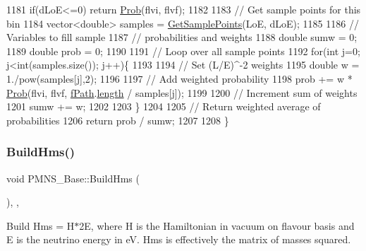 \begin{DoxyCode}
1181   \textcolor{keywordflow}{if}(dLoE<=0) \textcolor{keywordflow}{return} \hyperlink{classOscProb_1_1PMNS__Base_aec5c399b93261f1962a4b7dbbb44b973}{Prob}(flvi, flvf);
1182 
1183   \textcolor{comment}{// Get sample points for this bin}
1184   vector<double> samples = \hyperlink{classOscProb_1_1PMNS__Base_a9eac8d768c1424755ee41f7e783af179}{GetSamplePoints}(LoE, dLoE);
1185 
1186   \textcolor{comment}{// Variables to fill sample}
1187   \textcolor{comment}{// probabilities and weights}
1188   \textcolor{keywordtype}{double} sumw = 0;
1189   \textcolor{keywordtype}{double} prob = 0;
1190 
1191   \textcolor{comment}{// Loop over all sample points}
1192   \textcolor{keywordflow}{for}(\textcolor{keywordtype}{int} j=0; j<int(samples.size()); j++)\{
1193 
1194     \textcolor{comment}{// Set (L/E)^-2 weights}
1195     \textcolor{keywordtype}{double} w = 1./pow(samples[j],2);
1196 
1197     \textcolor{comment}{// Add weighted probability}
1198     prob += w * \hyperlink{classOscProb_1_1PMNS__Base_aec5c399b93261f1962a4b7dbbb44b973}{Prob}(flvi, flvf, \hyperlink{classOscProb_1_1PMNS__Base_a849437aa8891fe042e86886ce8f81c6e}{fPath}.\hyperlink{structOscProb_1_1NuPath_af22660894b6e25cf835500381b155557}{length} / samples[j]);
1199 
1200     \textcolor{comment}{// Increment sum of weights}
1201     sumw += w;
1202 
1203   \}
1204 
1205   \textcolor{comment}{// Return weighted average of probabilities}
1206   \textcolor{keywordflow}{return} prob / sumw;
1207 
1208 \}
\end{DoxyCode}
\mbox{\label{classOscProb_1_1PMNS__Base_ad0faf5eae755afb1baa1fcd5ffebad41}} 
\subsubsection{\texorpdfstring{Build\+Hms()}{BuildHms()}}
{\footnotesize\ttfamily void P\+M\+N\+S\+\_\+\+Base\+::\+Build\+Hms (\begin{DoxyParamCaption}{ }\end{DoxyParamCaption})\hspace{0.3cm}{\ttfamily [protected]}, {\ttfamily [virtual]}, {\ttfamily [inherited]}}

Build Hms = H$\ast$2E, where H is the Hamiltonian in vacuum on flavour basis and E is the neutrino energy in eV. Hms is effectively the matrix of masses squared.


